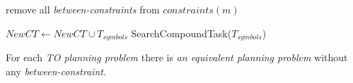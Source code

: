 \begin{algorithm}
\begin{algorithmic}[1]
                \State remove all \emph{between-constraints} from $constraints(m)$

                    \State $NewCT \gets NewCT \cup T_{symbols}$
                    \State SearchCompoundTask($T_{symbols}$)
                \EndFor
            \EndFor
        \EndProcedure
    \end{algorithmic}
\end{algorithm}


\begin{thm}\label{thm04:9}
    For each \emph{TO planning problem} there is \emph{an equivalent planning problem} without any \emph{between-constraint}.
\end{thm}

